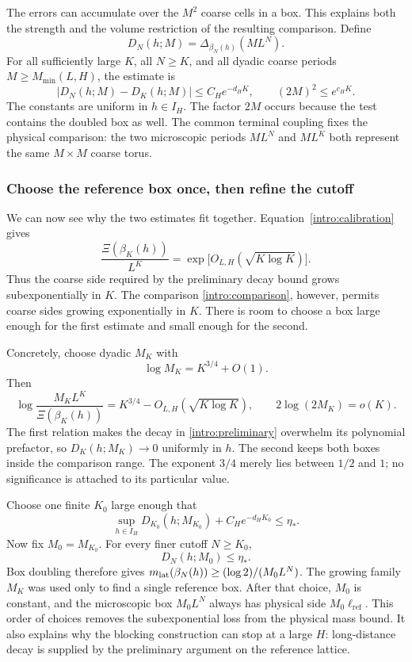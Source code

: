 The errors can accumulate over the $M^2$ coarse cells in a box. This
explains both the strength and the volume restriction of the resulting
comparison. Define
\begin{equation}
 D_N(h;M)=\Delta_{\beta_N(h)}(ML^N).
 \label{intro:DN}
\end{equation}
For all sufficiently large $K$, all $N\ge K$, and all dyadic
coarse periods $M\ge M_{\min}(L,H)$, the estimate is
\begin{equation}
 |D_N(h;M)-D_K(h;M)|\le C_He^{-d_HK},
 \qquad (2M)^2\le e^{c_HK}.
 \label{intro:comparison}
\end{equation}
The constants are uniform in $h\in I_H$. The factor $2M$ occurs because
the test contains the doubled box as well. The common terminal
coupling fixes the physical comparison: the two microscopic periods
$ML^N$ and $ML^K$ both represent the same $M\times M$ coarse torus.

\subsubsection{Choose the reference box once, then refine the cutoff}

We can now see why the two estimates fit together.
Equation~\eqref{intro:calibration} gives
\[
 \frac{\Xi(\beta_K(h))}{L^K}
 =\exp\!\bigl[O_{L,H}(\sqrt{K\log K})\bigr].
\]
Thus the coarse side required by the preliminary decay bound grows
subexponentially in $K$. The comparison
\eqref{intro:comparison}, however, permits coarse sides growing
exponentially in $K$. There is room to choose a box large enough for
the first estimate and small enough for the second.

Concretely, choose dyadic $M_K$ with
\[
 \log M_K=K^{3/4}+O(1).
\]
Then
\[
 \log\frac{M_KL^K}{\Xi(\beta_K(h))}
 =K^{3/4}-O_{L,H}(\sqrt{K\log K}),
 \qquad 2\log(2M_K)=o(K).
\]
The first relation makes the decay in \eqref{intro:preliminary}
overwhelm its polynomial prefactor, so $D_K(h;M_K)\to0$ uniformly in
$h$. The second keeps both boxes inside the comparison range. The
exponent $3/4$ merely lies between $1/2$ and $1$; no significance is
attached to its particular value.

Choose one finite $K_0$ large enough that
\[
 \sup_{h\in I_H}D_{K_0}(h;M_{K_0})+C_He^{-d_HK_0}\le\eta_*.
\]
Now fix $M_0=M_{K_0}$. For every finer cutoff $N\ge K_0$,
\[
 D_N(h;M_0)\le\eta_*.
\]
Box doubling therefore gives
$m_{\mathrm{lat}}(\beta_N(h))\ge(\log2)/(M_0L^N)$.
The growing family $M_K$ was used only to find a single reference box.
After that choice, $M_0$ is constant, and the microscopic box
$M_0L^N$ always has physical side $M_0\ell_{\mathrm{ref}}$.
This order of choices removes the subexponential loss from the
physical mass bound. It also explains why the blocking construction
can stop at a large $H$: long-distance decay is supplied by the
preliminary argument on the reference lattice.

